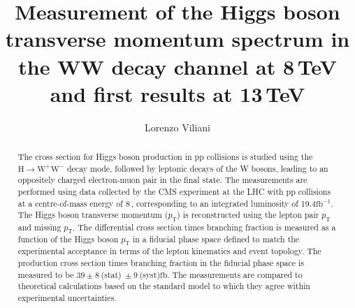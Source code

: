\documentclass[english,booktabs,hyperref,titling]{hepthesis}
\let\oldTeV\TeV
\renewcommand{\TeV}{\,\oldTeV}
\newcommand{\fb}{\ensuremath{\mathrm{fb}}}
\newcommand{\ifb}{\ensuremath{\mathrm{fb^{-1}}}}
\newcommand{\pt}{\ensuremath{p_\mathrm{T}}\xspace}
\begin{document}
\begin{frontmatter}

\title{Measurement of the Higgs boson transverse momentum spectrum in the WW decay channel at 8\,TeV and first results at 13\,TeV}
\author{Lorenzo Viliani}


\begin{abstract}
The cross section for Higgs boson production in pp collisions is studied using the $\mathrm{H} \to \mathrm{W}^+ \mathrm{W}^-$  decay mode, followed by leptonic decays of the W bosons, leading to an oppositely charged electron-muon pair in the final state. 
The measurements are performed using data collected by the CMS experiment at the LHC with pp collisions at a centre-of-mass energy of 8\TeV, corresponding to an integrated luminosity of 19.4\ifb.
The Higgs boson transverse momentum (\pt) is reconstructed using the lepton pair \pt and missing \pt. The differential cross section times branching fraction is measured as a function of the Higgs boson \pt in a fiducial phase space defined to match the experimental acceptance in terms of the lepton kinematics and event topology. The production cross section times branching fraction in the fiducial phase space is measured to be $39 \pm 8~$(stat)$~\pm 9~$(syst)\fb. The measurements are compared to theoretical calculations based on the standard model to which they agree within experimental uncertainties.
\end{abstract}

\cleardoublepage
\pagestyle{fancy}
\fancyhead{}
\fancyfoot{}
\fancyhead[RO]{\thepage}
\fancyhead[LE]{\thepage}
\tableofcontents
\cleardoublepage

\end{frontmatter}

\begin{mainmatter}








\end{mainmatter}

\begin{backmatter}

\clearpage\thispagestyle{empty}\cleardoublepage
{}
\printbibliography
\clearpage\thispagestyle{empty}\cleardoublepage

\end{backmatter}
\end{document}
